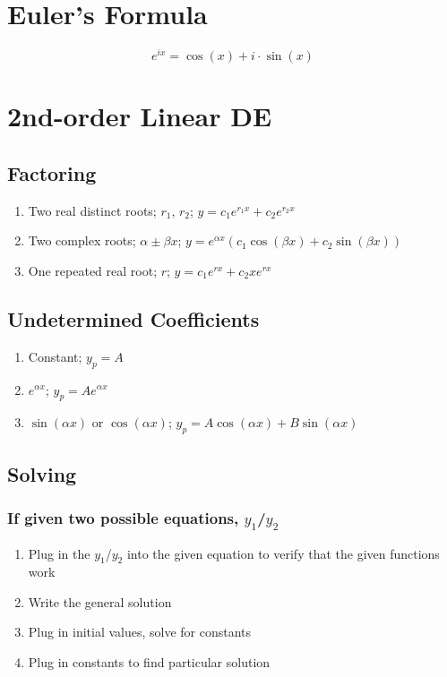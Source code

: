 \documentclass[12pt]{article}
\begin{document}
\section{Euler's Formula}
$$e^{ix} = \cos(x) + i \cdot \sin(x)$$

\section{2nd-order Linear DE}
\subsection{Factoring}
\begin{enumerate}
    \item Two real distinct roots; $r_1$, $r_2$; $y=c_1 e^{r_1 x} + c_2 e^{r_2 x}$
    \item Two complex roots; $\alpha \pm \beta x$; $y=e^{\alpha x}(c_1 \cos(\beta x) + c_2 \sin(\beta x))$
    \item One repeated real root; $r$; $y=c_1 e^{rx} +c_2 xe^{r x}$
\end{enumerate}

\subsection{Undetermined Coefficients}
\begin{enumerate}
    \item Constant; $y_p = A$
    \item $e^{\alpha x}$; $y_p = Ae^{\alpha x}$
    \item $\sin(\alpha x)$ or $\cos(\alpha x)$; $y_p = A\cos(\alpha x) + B\sin(\alpha x)$
\end{enumerate}

\subsection{Solving}
\subsubsection{If given two possible equations, $y_1$/$y_2$}
\begin{enumerate}
    \item Plug in the $y_1$/$y_2$ into the given equation to verify that the given functions work
    \item Write the general solution
    \item Plug in initial values, solve for constants
    \item Plug in constants to find particular solution
\end{enumerate}
\end{document}

